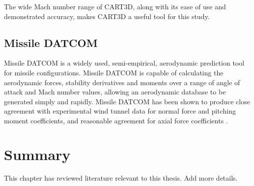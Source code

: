 The wide Mach number range of CART3D, along with its ease of use and demonstrated accuracy, makes CART3D a useful tool for this study. 

\subsection{Missile DATCOM}
Missile DATCOM is a widely used, semi-empirical, aerodynamic prediction tool for missile configurations. Missile DATCOM is capable of calculating the aerodynamic forces, stability derivatives and moments over a range of angle of attack and Mach number values, allowing an aerodynamic database to be generated simply and rapidly. Missile DATCOM has been shown to produce close agreement with experimental wind tunnel data for normal force and pitching moment coefficients, and reasonable agreement for axial force coefficients \cite{Sooy2005}. 

  \section{Summary}\label{chapter2:summary}

      This chapter has reviewed literature relevant to this thesis. Add more details.
      
      
      
      
